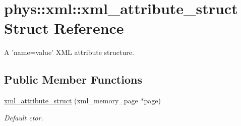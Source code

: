 \hypertarget{structphys_1_1xml_1_1xml__attribute__struct}{
\section{phys::xml::xml\_\-attribute\_\-struct Struct Reference}
\label{d4/db8/structphys_1_1xml_1_1xml__attribute__struct}
}


A 'name=value' XML attribute structure.  


\subsection*{Public Member Functions}
\begin{DoxyCompactItemize}
\item 
\hypertarget{structphys_1_1xml_1_1xml__attribute__struct_af09bb3f693cfa0c12a702ba41beb2601}{
\hyperlink{structphys_1_1xml_1_1xml__attribute__struct_af09bb3f693cfa0c12a702ba41beb2601}{xml\_\-attribute\_\-struct} (xml\_\-memory\_\-page $\ast$page)}
\label{d4/db8/structphys_1_1xml_1_1xml__attribute__struct_af09bb3f693cfa0c12a702ba41beb2601}

\begin{DoxyCompactList}\small\item\em Default ctor. \item\end{DoxyCompactList}\end{DoxyCompactItemize}
